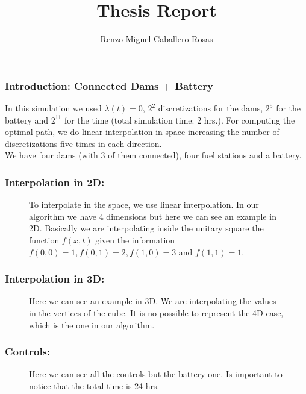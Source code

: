 \documentclass[aspectratio=169]{beamer}\usepackage[utf8]{inputenc}
\title{Thesis Report}
\subtitle{Renzo Miguel Caballero Rosas}
\begin{document}
\begin{frame}
\titlepage
\end{frame}

\begin{frame}\frametitle{Introduction: Connected Dams + Battery}
In this simulation we used $\lambda(t)=0$, $2^2$ discretizations for the dams, $2^5$ for the battery and $2^{11}$ for the time (total simulation time: 2 hrs.). For computing the optimal path, we do linear interpolation in space increasing the number of discretizations five times in each direction.\\
We have four dams (with 3 of them connected), four fuel stations and a battery.
\begin{figure}[ht!]
\centering
{}
\end{figure}
\end{frame}

\begin{frame}\frametitle{Interpolation in 2D:}
\begin{figure}[ht!]
\centering
{}
\caption{To interpolate in the space, we use linear interpolation. In our algorithm we have 4 dimensions but here we can see an example in 2D. Basically we are interpolating inside the unitary square the function $f(x,t)$ given the information $f(0,0)=1,f(0,1)=2,f(1,0)=3$ and $f(1,1)=1$.}
\end{figure}
\end{frame}

\begin{frame}\frametitle{Interpolation in 3D:}
\begin{figure}[ht!]
\centering
{}
\caption{Here we can see an example in 3D. We are interpolating the values in the vertices of the cube. It is no possible to represent the 4D case, which is the one in our algorithm.}
\end{figure}
\end{frame}

\begin{frame}\frametitle{Controls:}
\begin{figure}[ht!]
\centering
{}
\caption{Here we can see all the controls but the battery one. Is important to notice that the total time is 24 hrs.}
\end{figure}
\end{frame}
\end{document}
